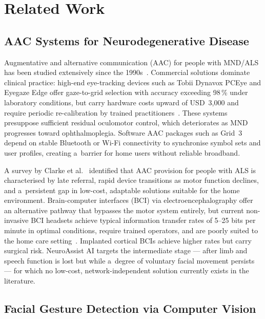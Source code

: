 
\section{Related Work}
\label{sec:related}

\subsection{AAC Systems for Neurodegenerative Disease}

Augmentative and alternative communication (AAC) for people with MND/ALS has been
studied extensively since the 1990s~\cite{beukelman2013aac}. Commercial solutions
dominate clinical practice: high-end eye-tracking devices such as Tobii Dynavox PCEye
and Eyegaze Edge offer gaze-to-grid selection with accuracy exceeding 98\,\% under
laboratory conditions, but carry hardware costs upward of USD~3{,}000 and require
periodic re-calibration by trained practitioners~\cite{beukelman2013aac}. These systems
presuppose sufficient residual oculomotor control, which deteriorates as MND progresses
toward ophthalmoplegia. Software AAC packages such as Grid~3 depend on stable Bluetooth
or Wi-Fi connectivity to synchronise symbol sets and user profiles, creating a~barrier
for home users without reliable broadband.

A survey by Clarke et al.~\cite{clarke2021aac} identified that AAC provision for
people with ALS is characterised by late referral, rapid device transitions as motor
function declines, and a~persistent gap in low-cost, adaptable solutions suitable for
the home environment. Brain-computer interfaces (BCI) via electroencephalography offer
an alternative pathway that bypasses the motor system entirely, but current non-invasive
BCI headsets achieve typical information transfer rates of 5--25 bits per minute in
optimal conditions, require trained operators, and are poorly suited to the home care
setting~\cite{zander2011passive}. Implanted cortical BCIs achieve higher rates but
carry surgical risk. NeuroAssist AI targets the intermediate stage — after limb and
speech function is lost but while a~degree of voluntary facial movement persists — for
which no low-cost, network-independent solution currently exists in the literature.

\subsection{Facial Gesture Detection via Computer Vision}

